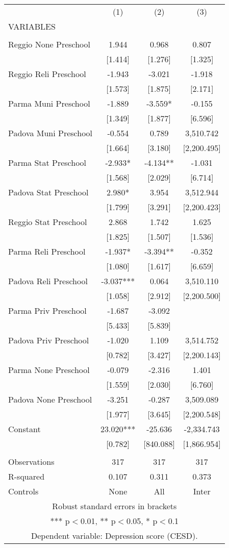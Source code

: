 \begin{tabular}{lccc} \hline
 & (1) & (2) & (3) \\
VARIABLES &  &  &  \\ \hline
 &  &  &  \\
Reggio None Preschool & 1.944 & 0.968 & 0.807 \\
 & [1.414] & [1.276] & [1.325] \\
Reggio Reli Preschool & -1.943 & -3.021 & -1.918 \\
 & [1.573] & [1.875] & [2.171] \\
Parma Muni Preschool & -1.889 & -3.559* & -0.155 \\
 & [1.349] & [1.877] & [6.596] \\
Padova Muni Preschool & -0.554 & 0.789 & 3,510.742 \\
 & [1.664] & [3.180] & [2,200.495] \\
Parma Stat Preschool & -2.933* & -4.134** & -1.031 \\
 & [1.568] & [2.029] & [6.714] \\
Padova Stat Preschool & 2.980* & 3.954 & 3,512.944 \\
 & [1.799] & [3.291] & [2,200.423] \\
Reggio Stat Preschool & 2.868 & 1.742 & 1.625 \\
 & [1.825] & [1.507] & [1.536] \\
Parma Reli Preschool & -1.937* & -3.394** & -0.352 \\
 & [1.080] & [1.617] & [6.659] \\
Padova Reli Preschool & -3.037*** & 0.064 & 3,510.110 \\
 & [1.058] & [2.912] & [2,200.500] \\
Parma Priv Preschool & -1.687 & -3.092 &  \\
 & [5.433] & [5.839] &  \\
Padova Priv Preschool & -1.020 & 1.109 & 3,514.752 \\
 & [0.782] & [3.427] & [2,200.143] \\
Parma None Preschool & -0.079 & -2.316 & 1.401 \\
 & [1.559] & [2.030] & [6.760] \\
Padova None Preschool & -3.251 & -0.287 & 3,509.089 \\
 & [1.977] & [3.645] & [2,200.548] \\
Constant & 23.020*** & -25.636 & -2,334.743 \\
 & [0.782] & [840.088] & [1,866.954] \\
 &  &  &  \\
Observations & 317 & 317 & 317 \\
R-squared & 0.107 & 0.311 & 0.373 \\
 Controls & None & All & Inter \\ \hline
\multicolumn{4}{c}{ Robust standard errors in brackets} \\
\multicolumn{4}{c}{ *** p$<$0.01, ** p$<$0.05, * p$<$0.1} \\
\multicolumn{4}{c}{ Dependent variable: Depression score (CESD).} \\
\end{tabular}
